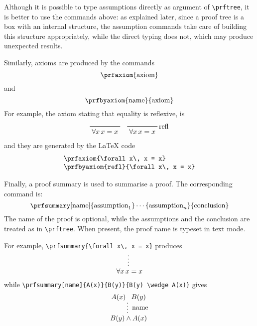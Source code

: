 \documentclass{amsart}
\begin{document}
Although it is possible to type assumptions directly as argument of
\verb|\prftree|, it is better to use the commands above: as explained
later, since a proof tree is a box with an internal structure, the
assumption commands take care of building this structure
appropriately, while the direct typing does not, which may produce
unexpected results.\vspace{2ex}

Similarly, axioms are produced by the commands
\begin{displaymath}
  \verb|\prfaxiom|\{\mbox{axiom}\}
\end{displaymath}
and
\begin{displaymath}
  \verb|\prfbyaxiom|\{\mbox{name}\}\{\mbox{axiom}\}
\end{displaymath}
For example, the axiom stating that equality is reflexive, is 
\begin{displaymath}
  \begin{array}{cc}
    \prfaxiom{\forall x\, x = x} &
    \prfbyaxiom{refl}{\forall x\, x = x}
  \end{array}
\end{displaymath}
and they are generated by the \LaTeX{} code
\begin{displaymath}
  \begin{array}{l}
    \verb|\prfaxiom{\forall x\, x = x}|\\
    \verb|\prfbyaxiom{refl}{\forall x\, x = x}|
  \end{array}
\end{displaymath}\vspace{-.2ex}

Finally, a proof summary is used to summarise a proof. The
corresponding command is:
\begin{displaymath}
  \verb|\prfsummary|[\mbox{name}]\{\mbox{assumption}_1\} \cdots
  \{\mbox{assumption}_n\}\{\mbox{conclusion}\}
\end{displaymath}
The name of the proof is optional, while the assumptions and the
conclusion are treated as in \verb|\prftree|. When present, the proof
name is typeset in text mode.

For example, \verb|\prfsummary{\forall x\, x = x}| produces
\begin{displaymath}
  \prfsummary{\forall x\, x = x}
\end{displaymath}
while
\verb|\prfsummary[name]{A(x)}{B(y)}{B(y) \wedge A(x)}|
gives
\begin{displaymath}
  \prfsummary[name]{A(x)}{B(y)}{B(y) \wedge A(x)}
\end{displaymath}\vspace{-.2ex}
\end{document}
